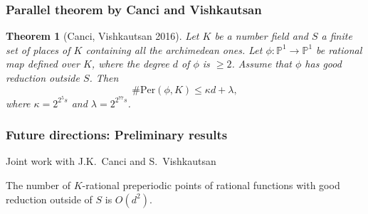 \documentclass{beamer}
\def\PP{{\mathbb P}}
\theoremstyle{thmstyle}
\newtheorem*{mythm}{Theorem}
\theoremstyle{mystyle}
\theoremstyle{qstnstyle}
\begin{document}
\begin{frame}
\frametitle{Parallel theorem by Canci and Vishkautsan}
\begin{mythm}[Canci, Vishkautsan  2016]
  Let $K$ be a number field and $S$ a finite set of places of $K$
  containing all the archimedean ones. Let
  $\phi\colon\PP^1\to\PP^1$ be rational map defined over $K$, where the degree $d$ of $\phi$ is $\geq 2$. Assume that 
  $\phi$ has good reduction outside $S$.  Then 
$$\#\text{Per}(\phi, K) \leq \kappa d+\lambda,$$ 
where $\kappa=2^{2^5s}$ and $\lambda=2^{2^{77}s}$.
\end{mythm}
\end{frame}




%
%
%
%
%


\begin{frame}
\frametitle{Future directions: Preliminary results}
Joint work with J.K.\ Canci and S.\ Vishkautsan \\
 

\vspace{5mm}

The number of $K$-rational preperiodic points of rational functions with good reduction outside of $S$ is $O(d^2)$. 


\end{frame}
\end{document}
